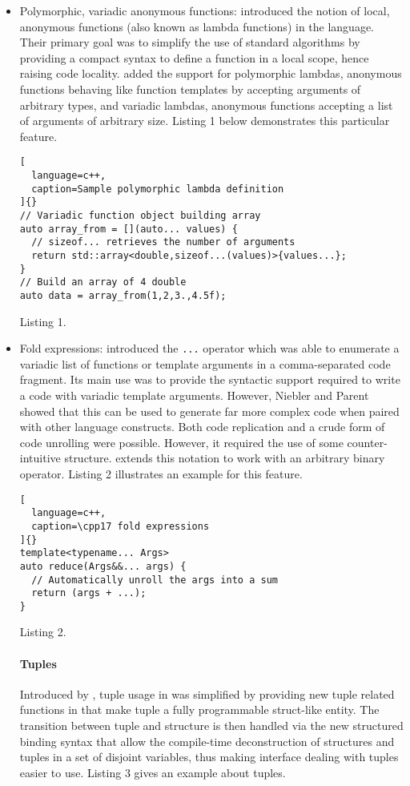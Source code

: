 \documentclass[../main]{subfiles}
\begin{document}
\begin{itemize}
\item Polymorphic, variadic anonymous functions: 
introduced the notion of local, anonymous functions
(also known as lambda functions) in the language.
Their primary goal was to simplify the use of standard
algorithms by providing a compact syntax to define a
function in a local scope, hence raising code locality.
 added the support for polymorphic lambdas, \ie
anonymous functions behaving like function templates
by accepting arguments of arbitrary types, and variadic
lambdas, \ie anonymous functions accepting a list of
arguments of arbitrary size. Listing 1 below demonstrates
this particular feature.

\begin{lstlisting}[
  language=c++,
  caption=Sample polymorphic lambda definition
]{}
// Variadic function object building array
auto array_from = [](auto... values) {
  // sizeof... retrieves the number of arguments
  return std::array<double,sizeof...(values)>{values...};
}
// Build an array of 4 double
auto data = array_from(1,2,3.,4.5f);
\end{lstlisting}
Listing 1.

\item Fold expressions:  introduced the \lstinline{...} operator
which was able to enumerate a variadic list of functions
or template arguments in a comma-separated code
fragment. Its main use was to provide the syntactic
support required to write a code with variadic template
arguments. However, Niebler and Parent showed that
this can be used to generate far more complex code
when paired with other language constructs. Both
code replication and a crude form of code unrolling
were possible. However, it required the use of some
counter-intuitive structure.  extends this notation
to work with an arbitrary binary operator. Listing 2
illustrates an example for this feature.

\begin{lstlisting}[
  language=c++,
  caption=\cpp17 fold expressions
]{}
template<typename... Args>
auto reduce(Args&&... args) {
  // Automatically unroll the args into a sum
  return (args + ...);
}
\end{lstlisting}
Listing 2.

\paragraph{Tuples} Introduced by , tuple usage in \cpp was
simplified by providing new tuple related functions in
 that make tuple a fully programmable struct-like
entity. The transition between tuple and structure is then
handled via the new structured binding syntax that allow
the compile-time deconstruction of structures and tuples
in a set of disjoint variables, thus making interface
dealing with tuples easier to use. Listing 3 gives an
example about tuples.


\end{itemize}
\end{document}
